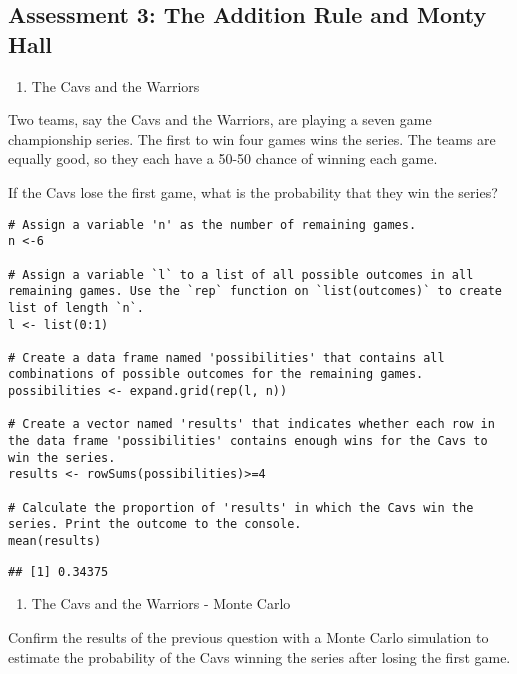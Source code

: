 \documentclass[
]{article}
\providecommand{\tightlist}{%
  \setlength{\itemsep}{0pt}\setlength{\parskip}{0pt}}
\begin{document}
\hypertarget{assessment-3-the-addition-rule-and-monty-hall}{%
\subsection{Assessment 3: The Addition Rule and Monty
Hall}\label{assessment-3-the-addition-rule-and-monty-hall}}

\begin{enumerate}
\def\labelenumi{\arabic{enumi}.}
\tightlist
\item
  The Cavs and the Warriors
\end{enumerate}

Two teams, say the Cavs and the Warriors, are playing a seven game
championship series. The first to win four games wins the series. The
teams are equally good, so they each have a 50-50 chance of winning each
game.

If the Cavs lose the first game, what is the probability that they win
the series?

\begin{verbatim}
# Assign a variable 'n' as the number of remaining games.
n <-6

# Assign a variable `l` to a list of all possible outcomes in all remaining games. Use the `rep` function on `list(outcomes)` to create list of length `n`.
l <- list(0:1)

# Create a data frame named 'possibilities' that contains all combinations of possible outcomes for the remaining games.
possibilities <- expand.grid(rep(l, n))

# Create a vector named 'results' that indicates whether each row in the data frame 'possibilities' contains enough wins for the Cavs to win the series.
results <- rowSums(possibilities)>=4

# Calculate the proportion of 'results' in which the Cavs win the series. Print the outcome to the console.
mean(results)
\end{verbatim}

\begin{verbatim}
## [1] 0.34375
\end{verbatim}

\begin{enumerate}
\def\labelenumi{\arabic{enumi}.}
\setcounter{enumi}{2}
\tightlist
\item
  The Cavs and the Warriors - Monte Carlo
\end{enumerate}

Confirm the results of the previous question with a Monte Carlo
simulation to estimate the probability of the Cavs winning the series
after losing the first game.
\end{document}

